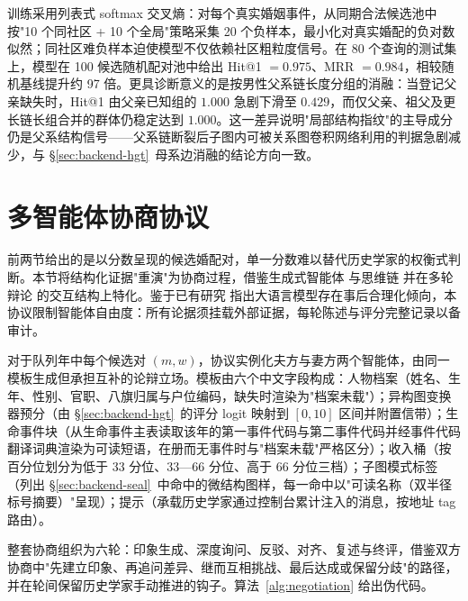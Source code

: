 训练采用列表式 softmax 交叉熵：对每个真实婚姻事件，从同期合法候选池中按"10 个同社区 + 10 个全局"策略采集 20 个负样本，最小化对真实婚配的负对数似然；同社区难负样本迫使模型不仅依赖社区粗粒度信号。在 80 个查询的测试集上，模型在 100 候选随机配对池中给出 Hit@1 \(=0.975\)、MRR \(=0.984\)，相较随机基线提升约 97 倍。更具诊断意义的是按男性父系链长度分组的消融：当登记父亲缺失时，Hit@1 由父亲已知组的 \(1.000\) 急剧下滑至 \(0.429\)，而仅父亲、祖父及更长链长组合并的群体仍稳定达到 \(1.000\)。这一差异说明"局部结构指纹"的主导成分仍是父系结构信号——父系链断裂后子图内可被关系图卷积网络利用的判据急剧减少，与 \S\ref{sec:backend-hgt}~母系边消融的结论方向一致。

\section{多智能体协商协议}\label{sec:backend-mas}

前两节给出的是以分数呈现的候选婚配对，单一分数难以替代历史学家的权衡式判断。本节将结构化证据"重演"为协商过程，借鉴生成式智能体\citep{park2023generative} 与思维链\citep{wei2022cot} 并在多轮辩论\citep{liang2023llm} 的交互结构上特化。鉴于已有研究\citep{turpin2023faithfulness} 指出大语言模型存在事后合理化倾向，本协议限制智能体自由度：所有论据须挂载外部证据，每轮陈述与评分完整记录以备审计。

对于队列年中每个候选对 \((m,w)\)，协议实例化夫方与妻方两个智能体，由同一模板生成但承担互补的论辩立场。模板由六个中文字段构成：人物档案（姓名、生年、性别、官职、八旗归属与户位编码，缺失时渲染为"档案未载"）；异构图变换器预分（由 \S\ref{sec:backend-hgt}~的评分 logit 映射到 \([0,10]\) 区间并附置信带）；生命事件块（从生命事件主表读取该年的第一事件代码与第二事件代码并经事件代码翻译词典渲染为可读短语，在册而无事件时与"档案未载"严格区分）；收入桶（按百分位划分为低于 33 分位、33—66 分位、高于 66 分位三档）；子图模式标签（列出 \S\ref{sec:backend-seal}~中命中的微结构图样，每一命中以"可读名称（双半径标号摘要）"呈现）；提示（承载历史学家通过控制台累计注入的消息，按地址 tag 路由）。

整套协商组织为六轮：印象生成、深度询问、反驳、对齐、复述与终评，借鉴双方协商中"先建立印象、再追问差异、继而互相挑战、最后达成或保留分歧"的路径，并在轮间保留历史学家手动推进的钩子。算法~\ref{alg:negotiation} 给出伪代码。

